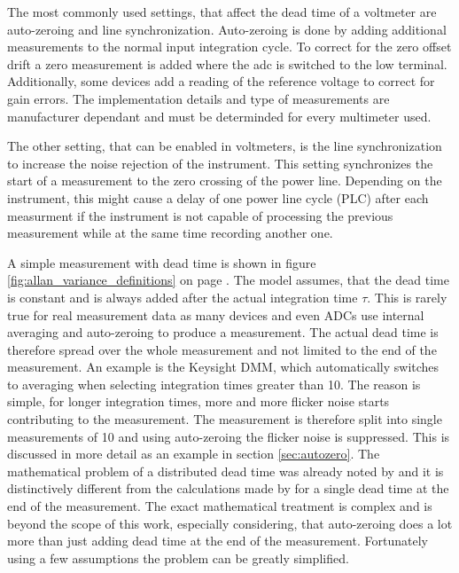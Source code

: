 The most commonly used settings, that affect the dead time of a voltmeter are auto-zeroing and line synchronization. Auto-zeroing is done by adding additional measurements to the normal input integration cycle. To correct for the zero offset drift a zero measurement is added where the adc is switched to the low terminal. Additionally, some devices add a reading of the reference voltage to correct for gain errors. The implementation details and type of measurements are manufacturer dependant and must be determinded for every multimeter used.

The other setting, that can be enabled in voltmeters, is the line synchronization to increase the noise rejection of the instrument. This setting synchronizes the start of a measurement to the zero crossing of the power line. Depending on the instrument, this might cause a delay of one power line cycle (PLC) after each measurment if the instrument is not capable of processing the previous measurement while at the same time recording another one.

A simple measurement with dead time is shown in figure \ref{fig:allan_variance_definitions} on page \pageref{fig:allan_variance_definitions}. The model assumes, that the dead time is constant and is always added after the actual integration time $\tau$. This is rarely true for real measurement data as many devices and even ADCs use internal averaging and auto-zeroing to produce a measurement. The actual dead time is therefore spread over the whole measurement and not limited to the end of the measurement. An example is the Keysight  DMM, which automatically switches to averaging when selecting integration times greater than \qty{10}{\plc}. The reason is simple, for longer integration times, more and more flicker noise starts contributing to the measurement. The measurement is therefore split into single measurements of \qty{10}{\plc} and using auto-zeroing the flicker noise is suppressed. This is discussed in more detail as an example in section \ref{sec:autozero}. The mathematical problem of a distributed dead time was already noted by \citeauthor{adev_noise_types} \cite{adev_noise_types} and it is distinctively different from the calculations made by \citeauthor{psd_to_adev} for a single dead time at the end of the measurement. The exact mathematical treatment is complex and is beyond the scope of this work, especially considering, that auto-zeroing does a lot more than just adding dead time at the end of the measurement. Fortunately using a few assumptions the problem can be greatly simplified.

